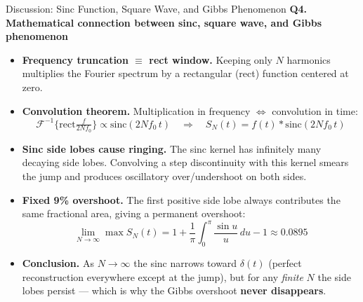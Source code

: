 \documentclass[aspectratio=169,11pt]{beamer}
\begin{document}
\begin{frame}{Discussion: Sinc Function, Square Wave, and Gibbs Phenomenon}
\textbf{Q4. Mathematical connection between sinc, square wave, and Gibbs phenomenon}

\begin{itemize}
  \item \textbf{Frequency truncation $\equiv$ rect window.}
  Keeping only $N$ harmonics multiplies the Fourier spectrum by a rectangular (rect) function centered at zero.

  \item \textbf{Convolution theorem.}
  Multiplication in frequency $\Longleftrightarrow$ convolution in time:
  \[
    \mathcal{F}^{-1}\!\bigl\{\mathrm{rect}\tfrac{f}{2Nf_0}\bigr\} \propto \mathrm{sinc}(2Nf_0\,t)
    \quad\Longrightarrow\quad S_N(t) = f(t) * \mathrm{sinc}(2Nf_0\,t)
  \]

  \item \textbf{Sinc side lobes cause ringing.}
  The sinc kernel has infinitely many decaying side lobes. Convolving a step discontinuity with this kernel smears the jump and produces oscillatory over/undershoot on both sides.

  \item \textbf{Fixed 9\% overshoot.}
  The first positive side lobe always contributes the same fractional area, giving a permanent overshoot:
  \[
    \lim_{N\to\infty}\max S_N(t) = 1 + \frac{1}{\pi}\int_0^{\pi}\frac{\sin u}{u}\,du - 1 \approx 0.0895
  \]

  \item \textbf{Conclusion.}
  As $N\to\infty$ the sinc narrows toward $\delta(t)$ (perfect reconstruction everywhere except at the jump), but for any \emph{finite} $N$ the side lobes persist --- which is why the Gibbs overshoot \textbf{never disappears}.
\end{itemize}
\end{frame}
\end{document}
